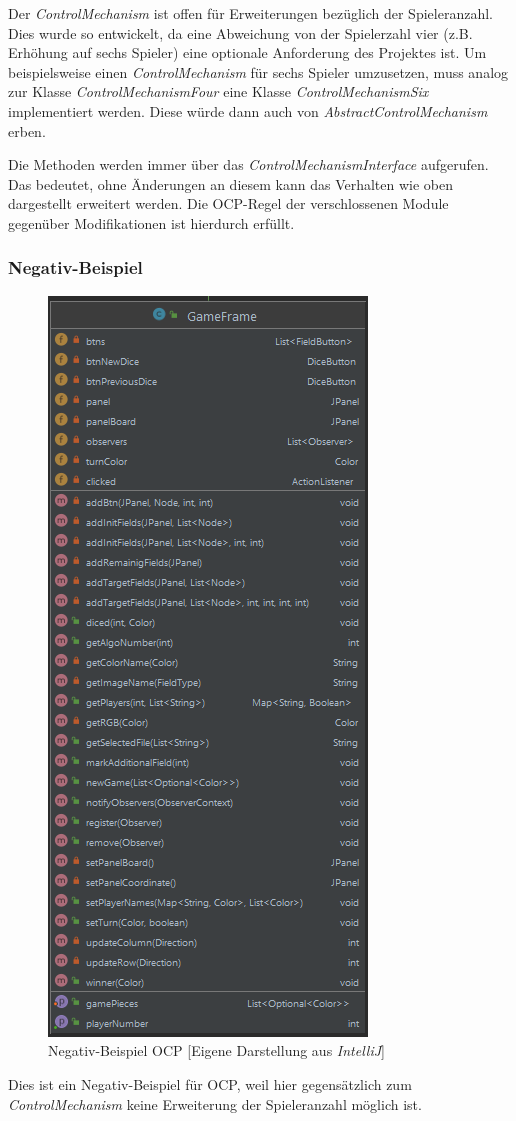 \newpage

\noindent Der \emph{ControlMechanism} ist offen für Erweiterungen bezüglich der Spieleranzahl. Dies wurde so entwickelt, da eine Abweichung von der Spielerzahl vier (z.B. Erhöhung auf sechs Spieler) eine optionale Anforderung des Projektes ist. Um beispielsweise einen \emph{ControlMechanism} für sechs Spieler umzusetzen, muss analog zur Klasse \emph{ControlMechanismFour} eine Klasse \emph{ControlMechanismSix} implementiert werden. Diese würde dann auch von \emph{AbstractControlMechanism} erben. 

Die Methoden werden immer über das \emph{ControlMechanismInterface} aufgerufen. Das bedeutet, ohne Änderungen an diesem kann das Verhalten wie oben dargestellt erweitert werden. Die OCP-Regel der verschlossenen Module gegenüber Modifikationen ist hierdurch erfüllt.

\newpage

\subsubsection{Negativ-Beispiel}
\begin{figure}[htbp]
\centerline{\includegraphics[scale=.6]{negativbeispiel_ocp}}
\caption{Negativ-Beispiel OCP [Eigene Darstellung aus \emph{IntelliJ}]}
\label{fig:negativbeispiel_ocp}
\end{figure}
\noindent Dies ist ein Negativ-Beispiel für OCP, weil hier gegensätzlich zum \emph{ControlMechanism} keine Erweiterung der Spieleranzahl möglich ist.

